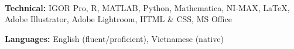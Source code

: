 \documentclass[letter, 10pt]{article}
\newcommand{\longunderline}[1]{\uline{#1\hfill\mbox{}}}
\begin{document}
		\noindent \longunderline{\normalsize{{}}}
	\\ \vspace{-7pt}
	
	\noindent \textbf{Technical:} IGOR Pro, R, MATLAB, Python,  Mathematica, NI-MAX, \LaTeX{}, Adobe Illustrator, Adobe Lightroom, HTML \& CSS, MS Office
	
	\noindent \textbf{Languages:} English (fluent/proficient), Vietnamese (native)\\
	\vspace{-7pt}

	

	
%	

	
\end{document}
